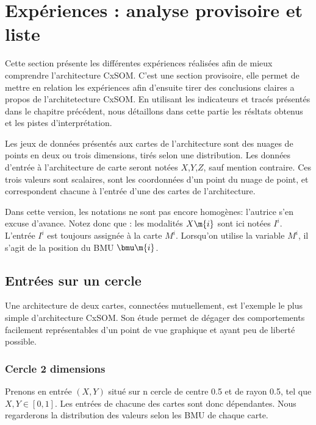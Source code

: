 
\chapter{Expériences : analyse provisoire et liste}
\graphicspath{{04-Analyse/}}
\minitoc
Cette section présente les différentes expériences réalisées afin de mieux comprendre l'architecture CxSOM. C'est une section provisoire, elle permet de mettre en relation les expériences afin d'ensuite tirer des conclusions claires a propos de l'architetecture CxSOM.
En utilisant les indicateurs et tracés présentés dans le chapitre précédent, nous détaillons dans cette partie les résltats obtenus et les pistes d'interprétation.

Les jeux de données présentés aux cartes de l'architecture sont des nuages de points en deux ou trois dimensions, tirés selon une distribution.
Les données d'entrée à l'architecture de carte seront notées $X$,$Y$,$Z$, sauf mention contraire. Ces trois valeurs sont scalaires, sont les coordonnées d'un point du nuage de point, et correspondent chacune à l'entrée d'une des cartes de l'architecture.

Dans cette version, les notations ne sont pas encore homogènes: l'autrice s'en excuse d'avance. Notez donc que : 
les modalités $X\m{i}$ sont ici notées $I^i$. L'entrée $I^i$ est toujours assignée à la carte $M^i$. Lorsqu'on utilise la variable $M^i$, il s'agit de la position du BMU $\bmu\m{i}$.

\section{Entrées sur un cercle}

Une architecture de deux cartes, connectées mutuellement, est l'exemple le plus simple d'architecture CxSOM. Son étude permet de dégager des comportements facilement représentables d'un point de vue graphique et ayant peu de liberté possible. 


\subsection{Cercle 2 dimensions}
Prenons en entrée $(X,Y)$ situé sur n cercle de centre 0.5 et de rayon 0.5, tel que $X,Y \in [0,1]$. 
Les entrées de chacune des cartes sont donc dépendantes. Nous regarderons la distribution des valeurs selon les BMU de chaque carte.

